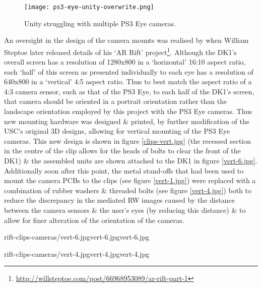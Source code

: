 \begin{figure}[h]
	\begin{center}
		\texttt{[image: ps3-eye-unity-overwrite.png]}
		\caption{Unity struggling with multiple PS3 Eye cameras.}
		\label{ps3-eye-unity-overwrite.png}
	\end{center}
\end{figure}

An oversight in the design of the camera mounts was realised by when William Steptoe later released details of his `AR Rift' project\footnote{\url{http://willsteptoe.com/post/66968953089/ar-rift-part-1}}. Although the DK1's overall screen has a resolution of 1280x800 in a `horizontal' 16:10 aspect ratio, each `half' of this screen as presented individually to each eye has a resolution of 640x800 in a `vertical' 4:5 aspect ratio. Thus to best match the aspect ratio of a 4:3 camera sensor, such as that of the PS3 Eye, to each half of the DK1's screen, that camera should be oriented in a portrait orientation rather than the landscape orientation employed by this project with the PS3 Eye cameras. Thus new mounting hardware was designed \& printed, by further modification of the USC's original 3D designs, allowing for vertical mounting of the PS3 Eye cameras. This new design is shown in figure \ref{clips-vert.jpg} (the recessed section in the centre of the clip allows for the heads of bolts to clear the front of the DK1) \& the assembled units are shown attached to the DK1 in figure \ref{vert-6.jpg}. Additionally soon after this point, the metal stand-offs that had been used to mount the camera PCBs to the clips (see figure \ref{vert-1.jpg}) were replaced with a combination of rubber washers \& threaded bolts (see figure \ref{vert-4.jpg}) both to reduce the discrepancy in the mediated RW images caused by the distance between the camera sensors \& the user's eyes (by reducing this distance) \& to allow for finer alteration of the orientation of the cameras.

       {rift-clips-cameras/vert-6.jpg}{vert-6.jpg}{vert-6.jpg}

       {rift-clips-cameras/vert-4.jpg}{vert-4.jpg}{vert-4.jpg}

